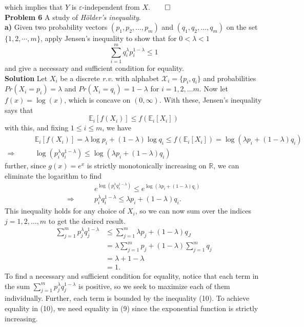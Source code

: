 \documentclass[11pt, letterpaper]{article}
\newcommand{\mbb}[1]{\mathbb{#1}}
\newcommand{\mc}[1]{\mathcal{#1}}
\begin{document}
which implies that $Y$ is $\varepsilon$-independent from $X$.\hfill{$\qed$}\\[10pt]
{\bf Problem 6} A study of {\it H\"older's inequality}.\\[10pt]
{\bf a)} Given two probability vectors $(p_1,p_2,\dots,p_m)$ and $(q_1,q_2,\dots,q_m)$ on the set $\{1,2,\cdots,m\}$, apply Jensen's inequality to
show that for $0<\lambda<1$
\[\sum_{i=1}^mq_i^\lambda p_i^{1-\lambda}\leq 1\]
and give a necessary and sufficient condition for equality.\\[10pt]
{\bf Solution} Let $X_i$ be a discrete {\it r.v.} with alphabet $\mc{X}_i=\{p_i,q_i\}$ and probabilities
$Pr(X_i=p_i)=\lambda$ and $Pr(X_i=q_i)=1-\lambda$ for $i=1,2,\dots m$. Now let $f(x)=\log(x)$, which is concave on
$(0,\infty)$. With these, Jensen's inequality says that
\[\mbb{E}_i[f(X_i)]\leq f(\mbb{E}_i[X_i])\]
with this, and fixing $1\leq i\leq m$, we have
\begin{align*}
    &\mbb{E}_i[f(X_i)]=\lambda\log p_i+(1-\lambda)\log q_i\leq f(\mbb{E}_i[X_i])=\log(\lambda p_i + (1-\lambda)q_i)\\
   \Rightarrow\qquad &\log(p_i^\lambda q_i^{1-\lambda})\leq\log(\lambda p_i+(1-\lambda)q_i)\tag{9}
\end{align*}
further, since $g(x)=e^x$ is strictly monotonically increasing on $\mbb{R}$, we can eliminate the logarithm to find
\begin{align*}
    &e^{\log(p_i^\lambda q_i^{1-\lambda})}\leq e^{\log(\lambda p_i+(1-\lambda)q_i)}\\
    \Rightarrow\qquad&p_i^\lambda q_i^{1-\lambda}\leq\lambda p_i+(1-\lambda)q_i.\tag{10}
\end{align*}
This inequality holds for any choice of $X_i$, so we can now sum over the indices $j=1,2,\dots,m$ to get the desired result.
\begin{align*}
    \sum_{j=1}^mp_j^\lambda q_j^{1-\lambda}&\leq\sum_{j=1}^m\lambda p_j+(1-\lambda)q_J\\
    &=\lambda\sum_{j=1}^mp_j+(1-\lambda)\sum_{j=1}^mq_j\\
    &=\lambda+1-\lambda\\
    &=1.
\end{align*}
To find a necessary and sufficient condition for equality, notice that each term in the sum $\sum_{j=1}^mp_j^\lambda q_j^{1-\lambda}$ is positive, so we
seek to maximize each of them individually. Further, each term is bounded by the inequality (10). To achieve equality in (10), we need equality in (9) since the exponential
function is strictly increasing.\\[10pt]
\end{document}
